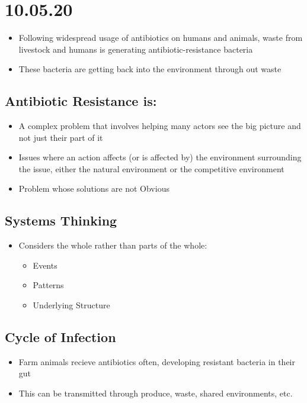 \documentclass[11pt]{article}
\author{Sudhan Chitgopkar}
\date{\today}
\title{}
\begin{document}
\tableofcontents

\section{10.05.20}
\label{sec:org661ee17}
\begin{itemize}
\item Following widespread usage of antibiotics on humans and animals, waste from livestock and humans
is generating antibiotic-resistance bacteria
\item These bacteria are getting back into the environment through out waste
\end{itemize}
\subsection{Antibiotic Resistance is:}
\label{sec:org08e40eb}
\begin{itemize}
\item A complex problem that involves helping many actors see the big picture and not just their
part of it
\item Issues where an action affects (or is affected by) the environment surrounding the issue,
either the natural environment or the competitive environment
\item Problem whose solutions are not Obvious
\end{itemize}
\subsection{Systems Thinking}
\label{sec:org4be904d}
\begin{itemize}
\item Considers the whole rather than parts of the whole:
\begin{itemize}
\item Events
\item Patterns
\item Underlying Structure
\end{itemize}
\end{itemize}
\subsection{Cycle of Infection}
\label{sec:orgf60a18f}
\begin{itemize}
\item Farm animals recieve antibiotics often, developing resistant bacteria in their gut
\item This can be transmitted through produce, waste, shared environments, etc.
\end{itemize}
\end{document}

